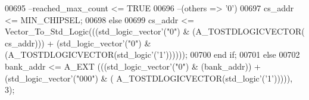\begin{DoxyCode}
00695 \textcolor{keyword}{                --reached\_max\_count <= TRUE}
00696 \textcolor{keyword}{                --(others => '0')}
00697                 \textcolor{vhdlchar}{cs_addr} \textcolor{vhdlchar}{<=} \textcolor{vhdlchar}{MIN_CHIPSEL};
00698               \textcolor{keywordflow}{else}
00699                 \textcolor{vhdlchar}{cs_addr} \textcolor{vhdlchar}{<=} \textcolor{vhdlchar}{Vector\_To\_Std\_Logic}\textcolor{vhdlchar}{(}\textcolor{vhdlchar}{(}\textcolor{vhdlchar}{(}\textcolor{comment}{std\_logic\_vector}\textcolor{vhdlchar}{'}\textcolor{vhdlchar}{(}\textcolor{vhdllogic}{"0"}\textcolor{vhdlchar}{)} \textcolor{vhdlchar}{&} \textcolor{vhdlchar}{(}\textcolor{vhdlchar}{A\_TOSTDLOGICVECTOR}\textcolor{vhdlchar}{(}\textcolor{vhdlchar}{
      cs_addr}\textcolor{vhdlchar}{)}\textcolor{vhdlchar}{)}\textcolor{vhdlchar}{)} \textcolor{vhdlchar}{+} \textcolor{vhdlchar}{(}\textcolor{comment}{std\_logic\_vector}\textcolor{vhdlchar}{'}\textcolor{vhdlchar}{(}\textcolor{vhdllogic}{"0"}\textcolor{vhdlchar}{)} \textcolor{vhdlchar}{&} \textcolor{vhdlchar}{(}\textcolor{vhdlchar}{A\_TOSTDLOGICVECTOR}\textcolor{vhdlchar}{(}\textcolor{comment}{std\_logic}\textcolor{vhdlchar}{'}\textcolor{vhdlchar}{(}\textcolor{vhdlchar}{'}\textcolor{vhdllogic}{}\textcolor{vhdllogic}{1}\textcolor{vhdlchar}{'}\textcolor{vhdlchar}{)}\textcolor{vhdlchar}{)}\textcolor{vhdlchar}{)}\textcolor{vhdlchar}{)}\textcolor{vhdlchar}{)}\textcolor{vhdlchar}{)};
00700               \textcolor{keywordflow}{end} \textcolor{keywordflow}{if};
00701             \textcolor{keywordflow}{else}
00702               \textcolor{vhdlchar}{bank_addr} \textcolor{vhdlchar}{<=} \textcolor{vhdlchar}{A\_EXT} \textcolor{vhdlchar}{(}\textcolor{vhdlchar}{(}\textcolor{vhdlchar}{(}\textcolor{comment}{std\_logic\_vector}\textcolor{vhdlchar}{'}\textcolor{vhdlchar}{(}\textcolor{vhdllogic}{"0"}\textcolor{vhdlchar}{)} \textcolor{vhdlchar}{&} \textcolor{vhdlchar}{(}\textcolor{vhdlchar}{bank_addr}\textcolor{vhdlchar}{)}\textcolor{vhdlchar}{)} \textcolor{vhdlchar}{+} \textcolor{vhdlchar}{(}\textcolor{comment}{std\_logic\_vector}\textcolor{vhdlchar}{'}\textcolor{vhdlchar}{(}\textcolor{vhdllogic}{"000"}\textcolor{vhdlchar}{)} \textcolor{vhdlchar}{&} \textcolor{vhdlchar}{(}\textcolor{vhdlchar}{
      A\_TOSTDLOGICVECTOR}\textcolor{vhdlchar}{(}\textcolor{comment}{std\_logic}\textcolor{vhdlchar}{'}\textcolor{vhdlchar}{(}\textcolor{vhdlchar}{'}\textcolor{vhdllogic}{}\textcolor{vhdllogic}{1}\textcolor{vhdlchar}{'}\textcolor{vhdlchar}{)}\textcolor{vhdlchar}{)}\textcolor{vhdlchar}{)}\textcolor{vhdlchar}{)}\textcolor{vhdlchar}{)}\textcolor{vhdlchar}{,} \textcolor{vhdllogic}{}\textcolor{vhdllogic}{3}\textcolor{vhdlchar}{)};

\end{DoxyCode}
